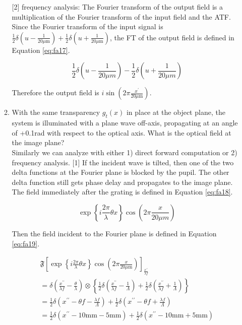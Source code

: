 \documentclass[main.tex]{subfiles}
\begin{document}
\begin{enumerate}
\begin{enumerate}
[2] frequency analysis: The Fourier transform of the output field is a multiplication of the Fourier transform of the input field and the ATF. Since the Fourier transform of the input signal is $\frac{1}{2} \delta\left(u-\frac{1}{20 \mu \mathrm{m}}\right)+\frac{1}{2} \delta\left(u+\frac{1}{20 \mu \mathrm{m}}\right)$, the FT of the output field is defined in Equation \ref{eq:fa17}.

\begin{equation}\label{eq:fa17}
\frac{1}{2} \delta\left(u-\frac{1}{20 \mu m}\right)-\frac{1}{2} \delta\left(u+\frac{1}{20 \mu m}\right)
\end{equation}

Therefore the output field is $i \sin \left(2 \pi \frac{x^{\prime}}{20 \mu \mathrm{m}}\right)$.

\item{With the same transparency $g_t(x)$ in place at the object plane, the system is illuminated with a plane wave off-axis, propagating at an angle of +0.1rad with respect to the optical axis. What is the optical field at the image plane?}\\

Similarly we can analyze with either 1) direct forward computation or 2) frequency analysis. [1] If the incident wave is tilted, then one of the two delta functions at the Fourier plane is blocked by the pupil. The other delta function still gets phase delay and propagates to the image plane. The field immediately after the grating is defined in Equation \ref{eq:fa18}.

\begin{equation}\label{eq:fa18}
\exp \left\{i \frac{2 \pi}{\lambda} \theta x\right\} \cos \left(2 \pi \frac{x}{20 \mu m}\right)
\end{equation}

Then the field incident to the Fourier plane is defined in Equation \ref{eq:fa19}.

\begin{equation}\label{eq:fa19}
\begin{aligned} 
\mathfrak{F}\left[\exp \left\{i \frac{2 \pi}{\lambda} \theta x\right\} \cos \left(2 \pi \frac{x}{20 \mu \mathrm{m}}\right)\right]_{\frac{x^{\prime \prime}}{\lambda f}}\\
=\delta\left(\frac{x^{\prime \prime}}{\lambda f}-\frac{\theta}{\lambda}\right) \otimes\left\{\frac{1}{2} \delta\left(\frac{x^{\prime \prime}}{\lambda f}-\frac{1}{\Lambda}\right)+\frac{1}{2} \delta\left(\frac{x^{\prime \prime}}{\lambda f}+\frac{1}{\Lambda}\right)\right\} \\ 
= \frac{1}{2} \delta\left(x^{\prime \prime}-\theta f-\frac{\lambda f}{\Lambda}\right)+\frac{1}{2} \delta\left(x^{\prime \prime}-\theta f+\frac{\lambda f}{\Lambda}\right) \\
=\frac{1}{2} \delta\left(x^{\prime \prime}-10 \mathrm{mm}-5 \mathrm{mm}\right)+\frac{1}{2} \delta\left(x^{\prime \prime}-10 \mathrm{mm}+5 \mathrm{mm}\right)
\end{aligned}
\end{equation}


\end{enumerate}
\end{enumerate}
\end{document}
